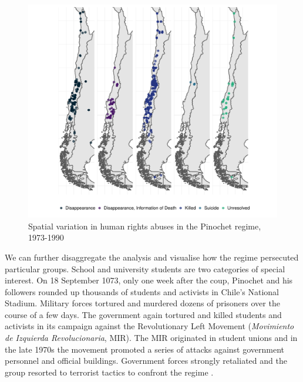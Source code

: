\documentclass[12pt,a4paper,]{article}
\begin{document}
\begin{figure}

{\centering \includegraphics{article_files/figure-latex/maps-1} 

}

\caption{Spatial variation in human rights abuses in the Pinochet regime, 1973-1990}\label{fig:maps}
\end{figure}

We can further disaggregate the analysis and visualise how the regime
persecuted particular groups. School and university students are two
categories of special interest. On 18 September 1073, only one week
after the coup, Pinochet and his followers rounded up thousands of
students and activists in Chile's National Stadium. Military forces
tortured and murdered dozens of prisoners over the course of a few days.
The government again tortured and killed students and activists in its
campaign against the Revolutionary Left Movement (\emph{Movimiento de
Izquierda Revolucionaria}, MIR). The MIR originated in student unions
and in the late 1970s the movement promoted a series of attacks against
government personnel and official buildings. Government forces strongly
retaliated and the group resorted to terrorist tactics to confront the
regime \citep{schlotterbeck2018beyond}.

\vspace{.5cm}
\end{document}

